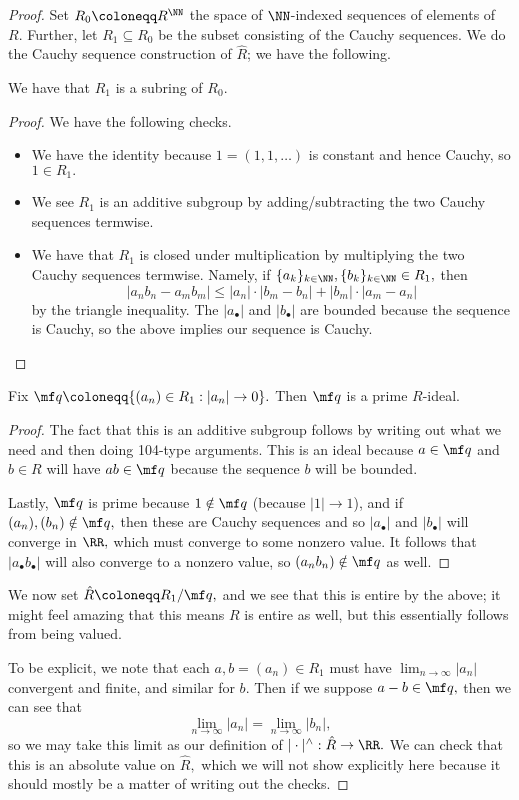 \documentclass[../notes.tex]{subfiles}
\begin{document}
\begin{proof}
	Set $R_0\coloneqq R^\NN$ the space of $\NN$-indexed sequences of elements of $R.$ Further, let $R_1\subseteq R_0$ be the subset consisting of the Cauchy sequences. We do the Cauchy sequence construction of $\hat R$; we have the following.
	\begin{lemma}
		We have that $R_1$ is a subring of $R_0.$
	\end{lemma}
	\begin{proof}
		We have the following checks.
		\begin{itemize}
			\item We have the identity because $1=(1,1,\ldots)$ is constant and hence Cauchy, so $1\in R_1.$
			\item We see $R_1$ is an additive subgroup by adding/subtracting the two Cauchy sequences termwise.
			\item We have that $R_1$ is closed under multiplication by multiplying the two Cauchy sequences termwise. Namely, if $\{a_k\}_{k\in\NN},\{b_k\}_{k\in\NN}\in R_1,$ then
			\[|a_nb_n-a_mb_m|\le|a_n|\cdot|b_m-b_n|+|b_m|\cdot|a_m-a_n|\]
			by the triangle inequality. The $|a_\bullet|$ and $|b_\bullet|$ are bounded because the sequence is Cauchy, so the above implies our sequence is Cauchy.
			\qedhere
		\end{itemize}
	\end{proof}
	\begin{lemma}
		Fix $\mf q\coloneqq \{(a_n)\in R_1:|a_n|\to0\}.$ Then $\mf q$ is a prime $R$-ideal.
	\end{lemma}
	\begin{proof}
		The fact that this is an additive subgroup follows by writing out what we need and then doing 104-type arguments. This is an ideal because $a\in\mf q$ and $b\in R$ will have $ab\in\mf q$ because the sequence $b$ will be bounded.
		
		Lastly, $\mf q$ is prime because $1\notin\mf q$ (because $|1|\to1$), and if $(a_n),(b_n)\notin\mf q,$ then these are Cauchy sequences and so $|a_\bullet|$ and $|b_\bullet|$ will converge in $\RR,$ which must converge to some nonzero value. It follows that $|a_\bullet b_\bullet|$ will also converge to a nonzero value, so $(a_nb_n)\notin\mf q$ as well.
	\end{proof}
	We now set $\hat R\coloneqq R_1/\mf q,$ and we see that this is entire by the above; it might feel amazing that this means $R$ is entire as well, but this essentially follows from being valued.

	To be explicit, we note that each $a,b=(a_n)\in R_1$ must have $\lim_{n\to\infty}|a_n|$ convergent and finite, and similar for $b.$ Then if we suppose $a-b\in\mf q,$ then we can see that
	\[\lim_{n\to\infty}|a_n|=\lim_{n\to\infty}|b_n|,\]
	so we may take this limit as our definition of $|\cdot|^\wedge:\hat R\to\RR.$ We can check that this is an absolute value on $\hat R,$ which we will not show explicitly here because it should mostly be a matter of writing out the checks.


\end{proof}
\end{document}
